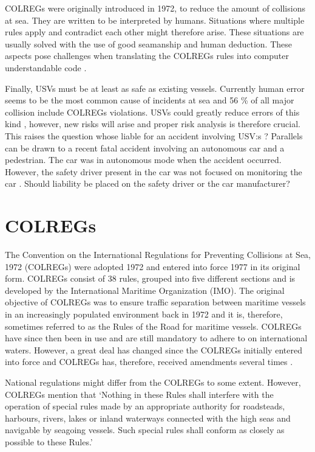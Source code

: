 COLREGs were originally introduced in 1972, to reduce the amount of collisions at sea. They are written to be interpreted by humans. Situations where multiple rules apply and contradict each other might therefore arise. These situations are usually solved with the use of good seamanship and human deduction. These aspects pose challenges when translating the COLREGs rules into computer understandable code \cite{benjamin2006method}.

Finally, USVs must be at least as safe as existing vessels. Currently human error  seems to be the most common cause of incidents at sea \cite{chauvin2011human,roberts2014fatal,uugurlu2015analysis} and 56 \% of all major collision include COLREGs violations\cite{statheros2008autonomous}. USVs could greatly reduce errors of this kind , however, new risks will arise and proper risk analysis is therefore crucial. This raises the question whose liable for an accident involving USV:s \cite{jokioinen2016remote}? Parallels can be drawn to a recent fatal accident involving an autonomous car and a pedestrian. The car was in autonomous mode when the accident occurred. However, the safety driver present in the car was not focused on monitoring the car \cite{uber_accident_liab}. Should liability be placed on the safety driver or the car manufacturer?

\chapter{COLREGs}
\label{sec_colreg}
The Convention on the International Regulations for Preventing Collisions at Sea, 1972 (COLREGs) were adopted 1972 and entered into force 1977 in its original form. COLREGs consist of 38 rules, grouped into five different sections and is developed by the International Maritime Organization (IMO).
The original objective of COLREGs was to ensure traffic separation between maritime vessels in an increasingly populated environment back in 1972 and it is, therefore, sometimes referred to as the Rules of the Road for maritime vessels. COLREGs have since then been in use and are still mandatory to adhere to on international waters. However, a great deal has changed since the COLREGs initially entered into force and COLREGs has, therefore,
received amendments several times \cite{colreg_about_imo}.

National regulations might differ from the COLREGs to some extent. However, COLREGs mention that ‘Nothing in these Rules shall interfere with the operation of special rules made by an appropriate authority for roadsteads, harbours, rivers, lakes or inland waterways connected with the high seas and navigable by seagoing vessels.
Such special rules shall conform as closely as possible to these Rules.’ \cite{colreg}

